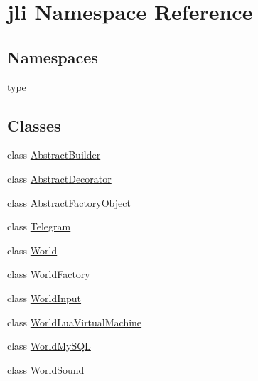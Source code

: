 \hypertarget{namespacejli}{\section{jli Namespace Reference}
\label{namespacejli}
}
\subsection*{Namespaces}
\begin{DoxyCompactItemize}
\item 
 \hyperlink{namespacejli_1_1type}{type}
\end{DoxyCompactItemize}
\subsection*{Classes}
\begin{DoxyCompactItemize}
\item 
class \hyperlink{classjli_1_1_abstract_builder}{Abstract\+Builder}
\item 
class \hyperlink{classjli_1_1_abstract_decorator}{Abstract\+Decorator}
\item 
class \hyperlink{classjli_1_1_abstract_factory_object}{Abstract\+Factory\+Object}
\item 
class \hyperlink{classjli_1_1_telegram}{Telegram}
\item 
class \hyperlink{classjli_1_1_world}{World}
\item 
class \hyperlink{classjli_1_1_world_factory}{World\+Factory}
\item 
class \hyperlink{classjli_1_1_world_input}{World\+Input}
\item 
class \hyperlink{classjli_1_1_world_lua_virtual_machine}{World\+Lua\+Virtual\+Machine}
\item 
class \hyperlink{classjli_1_1_world_my_s_q_l}{World\+My\+S\+Q\+L}
\item 
class \hyperlink{classjli_1_1_world_sound}{World\+Sound}
\end{DoxyCompactItemize}
